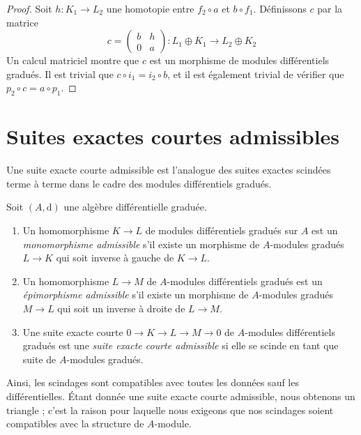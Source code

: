 \begin{proof}
Soit $h : K_1 \to L_2$ une homotopie entre $f_2 \circ a$ et $b \circ f_1$.
Définissons $c$ par la matrice
$$
c =
\left(
\begin{matrix}
b & h \\
0 & a
\end{matrix}
\right) :
L_1 \oplus K_1 \to L_2 \oplus K_2
$$
Un calcul matriciel montre que $c$ est un morphisme de modules
différentiels gradués. Il est trivial que $c \circ i_1 = i_2 \circ b$, et il est
également trivial de vérifier que $p_2 \circ c = a \circ p_1$.
\end{proof}











\section{Suites exactes courtes admissibles}
\label{section-admissible}

\noindent
Une suite exacte courte admissible est l'analogue des suites exactes scindées
terme à terme dans le cadre des modules différentiels gradués.

\begin{definition}
\label{definition-admissible-ses}
Soit $(A, \text{d})$ une algèbre différentielle graduée.
\begin{enumerate}
\item Un homomorphisme $K \to L$ de modules différentiels gradués sur $A$
est un {\it monomorphisme admissible} s'il existe un morphisme de $A$-modules
gradués $L \to K$ qui soit inverse à gauche de $K \to L$.
\item Un homomorphisme $L \to M$ de $A$-modules différentiels gradués
est un {\it épimorphisme admissible} s'il existe un morphisme de $A$-modules
gradués $M \to L$ qui soit un inverse à droite de $L \to M$.
\item Une suite exacte courte $0 \to K \to L \to M \to 0$ de $A$-modules
différentiels gradués est une {\it suite exacte courte admissible} si
elle se scinde en tant que suite de $A$-modules gradués.
\end{enumerate}
\end{definition}

\noindent
Ainsi, les scindages sont compatibles avec toutes les données sauf les
différentielles. Étant donnée une suite exacte courte admissible, nous
obtenons un triangle ; c'est la raison pour laquelle nous exigeons que nos
scindages soient compatibles avec la structure de $A$-module.

